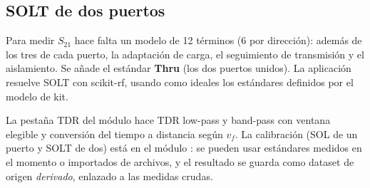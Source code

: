 \subsection{SOLT de dos puertos}
Para medir $S_{21}$ hace falta un modelo de 12 términos (6 por dirección): además de los tres de cada puerto, la adaptación de carga,
el seguimiento de transmisión y el aislamiento. Se añade el estándar \textbf{Thru} (los dos puertos unidos). La aplicación resuelve SOLT con
scikit-rf, usando como ideales los estándares definidos por el modelo de kit.

\begin{enlaapp}
La pestaña TDR del módulo  hace TDR low-pass y band-pass con ventana elegible y conversión del tiempo a distancia según $v_f$. La
calibración (SOL de un puerto y SOLT de dos) está en el módulo : se pueden usar estándares medidos en el momento o importados de archivos,
y el resultado se guarda como dataset de origen \emph{derivado}, enlazado a las medidas crudas.
\end{enlaapp}
